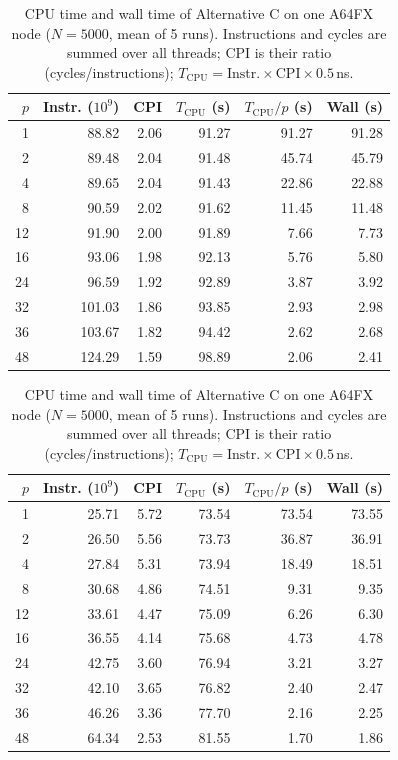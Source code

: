 \documentclass[conference]{IEEEtran}
\begin{document}
\makeatletter
\setlength{\@fptop}{0pt}
\setlength{\@dblfptop}{0pt}
\makeatother
\begin{table}[!t]
\centering
\begin{minipage}[t]{0.48\textwidth}
\centering
\caption{CPU time and wall time of Alternative A on one A64FX node
($N=5000$, mean of 5 runs). Instructions and cycles are summed over all
threads; CPI is their ratio (cycles/instructions); $T_\text{CPU}=\text{Instr.}\times\text{CPI}\times 0.5$\,ns.}
\label{tab:cpu-time}
\begin{tabular}{rrrrrr}
\hline
$p$ & Instr. ($10^9$) & CPI & $T_\text{CPU}$ (s) & $T_\text{CPU}/p$ (s) & Wall (s) \\
\hline
1  &  88.82 & 2.06 & 91.27 & 91.27 & 91.28 \\
2  &  89.48 & 2.04 & 91.48 & 45.74 & 45.79 \\
4  &  89.65 & 2.04 & 91.43 & 22.86 & 22.88 \\
8  &  90.59 & 2.02 & 91.62 & 11.45 & 11.48 \\
12 &  91.90 & 2.00 & 91.89 &  7.66 &  7.73 \\
16 &  93.06 & 1.98 & 92.13 &  5.76 &  5.80 \\
24 &  96.59 & 1.92 & 92.89 &  3.87 &  3.92 \\
32 & 101.03 & 1.86 & 93.85 &  2.93 &  2.98 \\
36 & 103.67 & 1.82 & 94.42 &  2.62 &  2.68 \\
48 & 124.29 & 1.59 & 98.89 &  2.06 &  2.41 \\
\hline
\end{tabular}
\end{minipage}
\hfill
\begin{minipage}[t]{0.48\textwidth}
\centering
\caption{CPU time and wall time of Alternative C on one A64FX node
($N=5000$, mean of 5 runs). Instructions and cycles are summed over all
threads; CPI is their ratio (cycles/instructions); $T_\text{CPU}=\text{Instr.}\times\text{CPI}\times 0.5$\,ns.}
\label{tab:cpu-time-c}
\begin{tabular}{rrrrrr}
\hline
$p$ & Instr. ($10^9$) & CPI & $T_\text{CPU}$ (s) & $T_\text{CPU}/p$ (s) & Wall (s) \\
\hline
1  & 25.71 & 5.72 & 73.54 & 73.54 & 73.55 \\
2  & 26.50 & 5.56 & 73.73 & 36.87 & 36.91 \\
4  & 27.84 & 5.31 & 73.94 & 18.49 & 18.51 \\
8  & 30.68 & 4.86 & 74.51 &  9.31 &  9.35 \\
12 & 33.61 & 4.47 & 75.09 &  6.26 &  6.30 \\
16 & 36.55 & 4.14 & 75.68 &  4.73 &  4.78 \\
24 & 42.75 & 3.60 & 76.94 &  3.21 &  3.27 \\
32 & 42.10 & 3.65 & 76.82 &  2.40 &  2.47 \\
36 & 46.26 & 3.36 & 77.70 &  2.16 &  2.25 \\
48 & 64.34 & 2.53 & 81.55 &  1.70 &  1.86 \\
\hline
\end{tabular}
\end{minipage}
\end{table}
\end{document}
